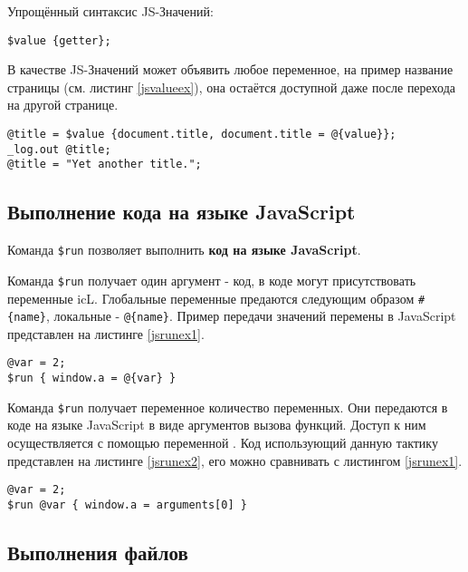 \documentclass[a4paper, 14pt]{extarticle}
\begin{document}
Упрощённый синтаксис JS-Значений:
\begin{lstlisting}[numbers=none]
$value {getter};
\end{lstlisting}

В качестве JS-Значений может объявить любое переменное, на пример название страницы (см. листинг \ref{jsvalueex}), она остаётся доступной даже после перехода на другой странице.

\begin{lstlisting}[caption=Использование JS-Значений, label=jsvalueex]
@title = $value {document.title, document.title = @{value}};
_log.out @title;
@title = "Yet another title.";
\end{lstlisting}

\subsection{Выполнение кода на языке JavaScript}

Команда \lstinline|$run| позволяет выполнить {\bf код на языке JavaScript}.

\code{[icL]} Команда \lstinline|$run| получает один аргумент - код, в коде могут присутствовать переменные icL. Глобальные переменные предаются следующим образом \lstinline|#{name}|, локальные - \lstinline|@{name}|. Пример передачи значений перемены в JavaScript представлен на листинге \ref{jsrunex1}.

\begin{lstlisting}[caption=Выполнение кода на языке JavaScript (icL), label=jsrunex1]
@var = 2;
$run { window.a = @{var} }
\end{lstlisting}

\code{[w3c]} Команда \lstinline|$run| получает переменное количество переменных. Они передаются в коде на языке JavaScript в виде аргументов вызова функций. Доступ к ним осуществляется с помощью переменной . Код использующий данную тактику представлен на листинге \ref{jsrunex2}, его можно сравнивать с листингом \ref{jsrunex1}.

\begin{lstlisting}[caption=Выполнение кода на языке JavaScript (w3c) label=jsrunex2]
@var = 2;
$run @var { window.a = arguments[0] }
\end{lstlisting}

\subsection{Выполнения файлов}
\end{document}
